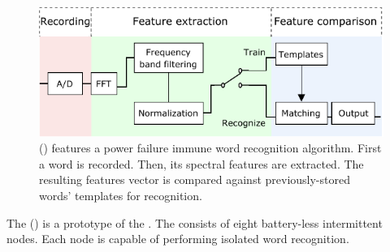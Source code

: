 \begin{figure}
	\centering
	\includegraphics[width=\columnwidth]{figures/cis}
	\caption{\fullCIM (\cim) features a power failure immune word recognition algorithm. First a word is recorded. Then, its spectral features are extracted. The resulting features vector is compared against previously-stored words' templates for recognition.}
	\label{fig:cis}
\end{figure}
%
The \fullcim (\cim) is a prototype of the \fullcis. The \cim consists of eight battery-less intermittent nodes. Each node is capable of performing isolated word recognition. 



